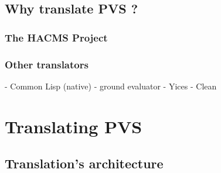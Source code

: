 \documentclass[12pt,a4paper]{article}
\begin{document}
\subsection{Why translate PVS ?}

\subsubsection*{The HACMS Project}

\subsubsection*{Other translators}

- Common Lisp (native)
- ground evaluator
- Yices
- Clean




\section{Translating PVS}

\subsection{Translation's architecture}
\end{document}
